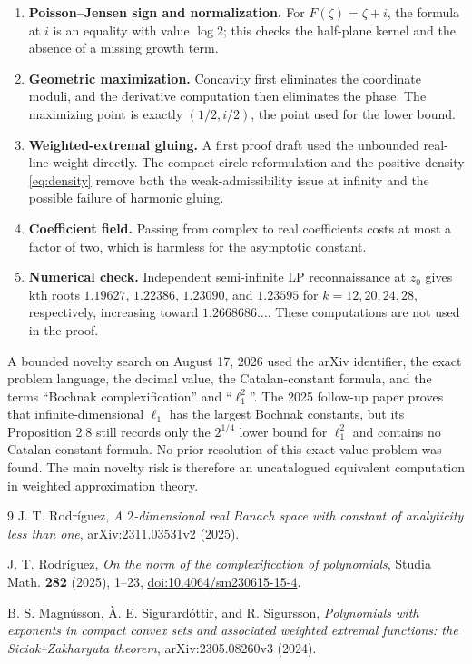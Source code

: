 \documentclass[11pt]{article}
\begin{document}
\begin{enumerate}[leftmargin=*]
\item \textbf{Poisson--Jensen sign and normalization.}  For
$F(\zeta)=\zeta+i$, the formula at $i$ is an equality with value $\log2$;
this checks the half-plane kernel and the absence of a missing growth term.
\item \textbf{Geometric maximization.}  Concavity first eliminates the
coordinate moduli, and the derivative computation then eliminates the phase.
The maximizing point is exactly $(1/2,i/2)$, the point used for the lower
bound.
\item \textbf{Weighted-extremal gluing.}  A first proof draft used the
unbounded real-line weight directly.  The compact circle reformulation and
the positive density \eqref{eq:density} remove both the weak-admissibility
issue at infinity and the possible failure of harmonic gluing.
\item \textbf{Coefficient field.}  Passing from complex to real coefficients
costs at most a factor of two, which is harmless for the asymptotic constant.
\item \textbf{Numerical check.}  Independent semi-infinite LP reconnaissance
at $z_0$ gives kth roots $1.19627$, $1.22386$, $1.23090$, and $1.23595$
for $k=12,20,24,28$, respectively, increasing toward
$1.2668686\ldots$.  These computations are not used in the proof.
\end{enumerate}

A bounded novelty search on August 17, 2026 used the arXiv identifier, the
exact problem language, the decimal value, the Catalan-constant formula, and
the terms ``Bochnak complexification'' and ``$\ell_1^2$''.  The 2025 follow-up
paper \cite{Rodriguez2025} proves that infinite-dimensional $\ell_1$ has the
largest Bochnak constants, but its Proposition 2.8 still records only the
$2^{1/4}$ lower bound for $\ell_1^2$ and contains no Catalan-constant formula.
No prior resolution of this exact-value problem was found.  The main novelty
risk is therefore an uncatalogued equivalent computation in weighted
approximation theory.

\begin{thebibliography}{9}
J. T. Rodr\'iguez,
\emph{A $2$-dimensional real Banach space with constant of analyticity less
than one}, arXiv:2311.03531v2 (2025).

J. T. Rodr\'iguez,
\emph{On the norm of the complexification of polynomials},
Studia Math. \textbf{282} (2025), 1--23,
\href{https://doi.org/10.4064/sm230615-15-4}{doi:10.4064/sm230615-15-4}.

B. S. Magn\'usson, \`A. E. Sigur{\dh}ard\'ottir, and R. Sigur{\dh}sson,
\emph{Polynomials with exponents in compact convex sets and associated
weighted extremal functions: the Siciak--Zakharyuta theorem},
arXiv:2305.08260v3 (2024).
\end{thebibliography}
\end{document}
